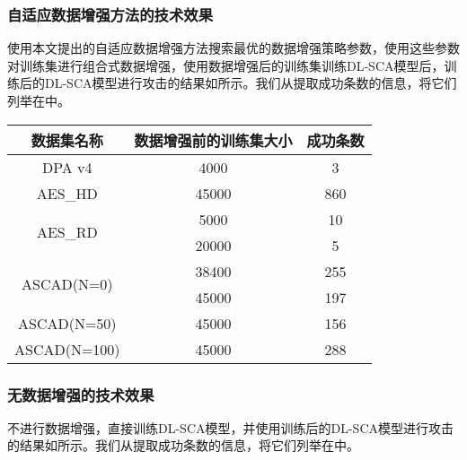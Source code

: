{\begin{figure}[!h]
		\label{fig:mydlscatest}
	\end{figure}


	\subsubsection{自适应数据增强方法的技术效果}
	使用本文提出的自适应数据增强方法搜索最优的数据增强策略参数，使用这些参数对训练集进行组合式数据增强，使用数据增强后的训练集训练DL-SCA模型后，训练后的DL-SCA模型进行攻击的结果如所示。我们从提取成功条数的信息，将它们列举在中。
	
	\begin{table}[!h]
		\label{tab:adamtd}
		\centering
		\begin{tabular}{c|cc}
			\hline
			数据集名称&数据增强前的训练集大小&成功条数\\
			\hline
			\hline
			DPA v4    &4000&3\\
			\hline
			AES\_HD   &45000&860\\
			\hline
			\multirow{2}{*}{AES\_RD}
				&5000&10\\
				&20000&5\\
			\hline
			\multirow{2}{*}{ASCAD(N=0)}
				&38400&255\\
				&45000&197\\
			\hline
			ASCAD(N=50)&45000&156\\
			\hline
			ASCAD(N=100)&45000&288\\
			\hline
		\end{tabular}
	\end{table}
	\subsubsection{无数据增强的技术效果}
	不进行数据增强，直接训练DL-SCA模型，并使用训练后的DL-SCA模型进行攻击的结果如所示。我们从提取成功条数的信息，将它们列举在中。
	
}
